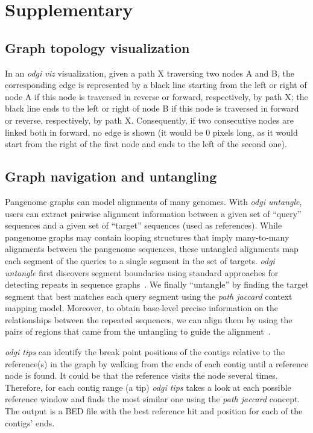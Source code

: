 \documentclass{bioinfo}
\newcommand{\beginsupplement}{%
	\setcounter{table}{0}
	\renewcommand{\thetable}{S\arabic{table}}%
	\setcounter{figure}{0}
	\renewcommand{\thefigure}{S\arabic{figure}}%
}
\begin{document}
\clearpage
\beginsupplement

\section{Supplementary}

\subsection{Graph topology visualization}
\label{sec:supp_visualization}
In an \textit{odgi viz} visualization, given a path X traversing two nodes A and B, the corresponding edge is represented by a black line starting from the left or right of node A if this node is traversed in reverse or forward, respectively, by path X;
the black line ends to the left or right of node B if this node is traversed in forward or reverse, respectively, by path X.
Consequently, if two consecutive nodes are linked both in forward, no edge is shown (it would be 0 pixels long, as it would start from the right of the first node and ends to the left of the second one).

\subsection{Graph navigation and untangling}
\label{sec:supp_navigation}
Pangenome graphs can model alignments of many genomes.
With \textit{odgi untangle}, users can extract pairwise alignment information between a given set of ``query'' sequences and a given set of ``target'' sequences (used as references).
While pangenome graphs may contain looping structures that imply many-to-many alignments between the pangenome sequences, these untangled alignments map each segment of the queries to a single segment in the set of targets.
\textit{odgi untangle} first discovers segment boundaries using standard approaches for detecting repeats in sequence graphs~\citep{Pevzner_2004}.
We finally ``untangle'' by finding the target segment that best matches each query segment using the \textit{path jaccard} context mapping model.
Moreover, to obtain base-level precise information on the relationships between the repeated sequences, we can align them by using the pairs of regions that came from the untangling to guide the alignment~\citep{wfmash}.

\textit{odgi tips} can identify the break point positions of the contigs relative to the reference(s) in the graph by walking from the ends of each contig until a reference node is found.
It could be that the reference visits the node several times. Therefore, for each contig range (a tip) \textit{odgi tips} takes a look at each possible reference window and finds the most similar one using the \textit{path jaccard} concept.
The output is a BED file with the best reference hit and position for each of the contigs' ends.
\end{document}
